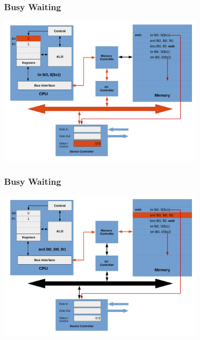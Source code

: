 \documentclass{beamer}
\begin{document}
\begin{frame}%
\frametitle{Busy Waiting}

\vspace*{-0.2cm}
\begin{center}
\hspace*{-1cm}\includegraphics[width=10cm]{busy_waiting4.pdf}
\end{center}

\end{frame}

\begin{frame}%
\frametitle{Busy Waiting}

\vspace*{-0.2cm}
\begin{center}
\hspace*{-1cm}\includegraphics[width=10cm]{busy_waiting5.pdf}
\end{center}

\end{frame}
\end{document}
